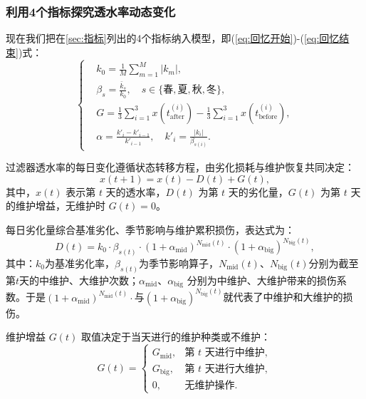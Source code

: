 \documentclass[withoutpreface,bwprint]{cumcmthesis}
\begin{document}
\subsubsection{利用4个指标探究透水率动态变化}

现在我们把在\ref{sec:指标}列出的4个指标纳入模型，即(\ref{eq:回忆开始})-(\ref{eq:回忆结束})式：
\[
	\left\{
	\begin{aligned}
		& k_0 = \frac{1}{M} \sum_{m=1}^{M} |k_m|, \\[8pt]
		& \beta_s = \frac{\bar{k}_s}{k_0}, \quad s \in \{\text{春},\text{夏},\text{秋},\text{冬}\}, \\[8pt]
		& G = \frac{1}{3}\sum_{i=1}^{3} x(t_{\text{after}}^{(i)}) - \frac{1}{3}\sum_{i=1}^{3} x(t_{\text{before}}^{(i)}), \\[8pt]
		& \alpha = \frac{k'_i - k'_{i-1}}{k'_{i-1}}, \quad k'_i = \frac{|k_i|}{\beta_{s(i)}}.
	\end{aligned}
	\right.
\]

过滤器透水率的每日变化遵循状态转移方程，由劣化损耗与维护恢复共同决定：
\begin{equation}
	x(t+1) = x(t) - D(t) + G(t),
\end{equation}
其中，$x(t)$ 表示第 $t$ 天的透水率，$D(t)$ 为第 $t$ 天的劣化量，$G(t)$ 为第 $t$ 天的维护增益，无维护时 $G(t)=0$。

每日劣化量综合基准劣化、季节影响与维护累积损伤，表达式为：
\begin{equation}
	D(t) = k_0 \cdot \beta_{s(t)} \cdot (1+\alpha_{\text{mid}})^{N_{\text{mid}}(t)} \cdot (1+\alpha_{\text{big}})^{N_{\text{big}}(t)},
\end{equation}
其中：$k_0$为基准劣化率，$\beta_{s(t)}$为季节影响算子，$N_{\text{mid}}(t)$、$N_{\text{big}}(t)$分别为截至第$t$天的中维护、大维护次数；$\alpha_{\text{mid}}$、$\alpha_{\text{big}}$ 分别为中维护、大维护带来的损伤系数。于是$(1+\alpha_{\text{mid}})^{N_{\text{mid}}(t)} \cdot$与$(1+\alpha_{\text{big}})^{N_{\text{big}}(t)}$就代表了中维护和大维护的损伤。

维护增益 $G(t)$ 取值决定于当天进行的维护种类或不维护：
\begin{equation}
	G(t) =
	\begin{cases}
		G_{\text{mid}}, & \text{第 } t \text{ 天进行中维护}, \\
		G_{\text{big}}, & \text{第 } t \text{ 天进行大维护}, \\
		0, & \text{无维护操作}.
	\end{cases}
\end{equation}
\end{document}
